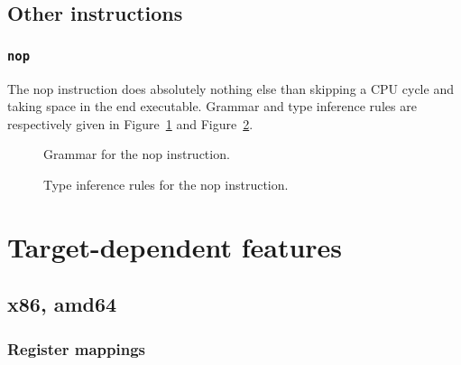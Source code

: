 \section{Other instructions}\label{sec:nstar-instructionset-other}

\subsection{\texttt{nop}}\label{subsec:nstar-instructionset-other-nop}

The {\Iformat nop} instruction does absolutely nothing else than skipping a CPU cycle and taking space in the end executable.
Grammar and type inference rules are respectively given in Figure~\ref{fig:nstar-instructionset-other-nop-grammar} and Figure~\ref{fig:nstar-instructionset-other-nop-typerules}.

\begin{figure}[H]
	\centering


	\caption{Grammar for the {\Iformat nop} instruction.}
	\label{fig:nstar-instructionset-other-nop-grammar}
\end{figure}

\begin{figure}[H]
	\centering


	\caption{Type inference rules for the {\Iformat nop} instruction.}
	\label{fig:nstar-instructionset-other-nop-typerules}
\end{figure}

\chapter{Target-dependent features}\label{chap:nstar-specific}

\section{x86, amd64}\label{sec:nstar-specific-x86amd64}

\subsection{Register mappings}\label{subsec:nstar-specific-x86amd64-registers}

